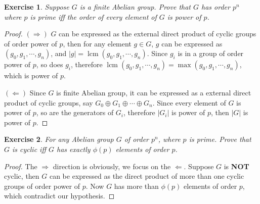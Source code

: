 \documentclass[14pt]{extarticle}
\newtheorem{exercise}{Exercise}[section]
\newcommand{\join}[3][,]{#2_0 #1 #2_1 #1 \cdots #1 #2_{#3}}
\newcommand{\1}{\{e\}}
\DeclareMathOperator{\lcm}{lcm}
\begin{document}
\begin{exercise}
  Suppose $G$ is a finite Abelian group. Prove that
  $G$ has order $p^n$ where $p$ is prime iff 
  the order of every element of $G$ is power of $p$.
\end{exercise}
\begin{proof}
  $(\Rightarrow)$ $G$ can be expressed as the external direct product
  of cyclic groups of order power of $p$, then for any element $g \in G$,
  $g$ can be expressed as $(\join{g}{n})$, and $|g| = \lcm(\join{g}{n})$.
  Since $g_i$ is in a group of order power of $p$, so does $g_i$, therefore
  $\lcm(\join{g}{n}) = \max(\join{g}{n})$, which is power of $p$.

  $(\Leftarrow)$ Since $G$ is finite Abelian group, it can be expressed as
  a external direct product of cyclic groups, say $\join[\oplus]{G}{n}$.
  Since every element of $G$ is power of $p$, so are the generators of $G_i$,
  therefore $|G_i|$ is power of $p$, then $|G|$ is power of $p$.
\end{proof}

\setcounter{exercise}{41}
\begin{exercise}
  For any Abelian group $G$ of order $p^n$, where $p$ is prime.
  Prove that $G$ is cyclic iff $G$ has exactly $\phi(p)$ elements of order $p$.
\end{exercise}
\begin{proof}
  The $\Rightarrow$ direction is obviously, we focus on the $\Leftarrow$.
  Suppose $G$ is \textbf{NOT} cyclic, then $G$ can be expressed as 
  the direct product of more than
  one cyclic groups of order power of $p$. Now $G$ has more than $\phi(p)$ elements
  of order $p$, which contradict our hypothesis.
\end{proof}
\end{document}
